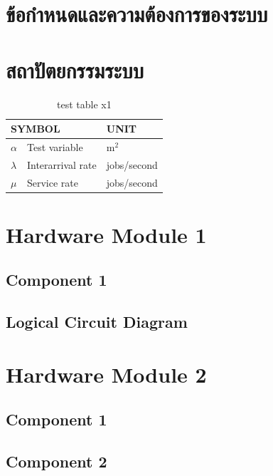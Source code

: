 \documentclass[12pt,oneside,openright,a4paper]{cpe-thai-project}
\begin{document}
\section{ข้อกำหนดและความต้องการของระบบ}

\section{สถาปัตยกรรมระบบ}

\begin{table}[!h]
\centering
\caption{test table x1}\label{tbl:symbols}
\begin{tabular}{@{}p{}|p{}p{}}\hline
\multicolumn{2}{l}{\textbf{SYMBOL}}  & \textbf{UNIT} \\ \hline 
$\alpha$ & Test variable\hfill & m$^2$ \\
$\lambda$ & Interarrival rate\hfill &  jobs/second\\
$\mu$ & Service rate\hfill & jobs/second \\ \hline
\end{tabular}
\end{table}



\section{Hardware Module 1}
\subsection{Component 1}
\subsection{Logical Circuit Diagram}

\section{Hardware Module 2}
\subsection{Component 1}
\subsection{Component 2}
\end{document}
